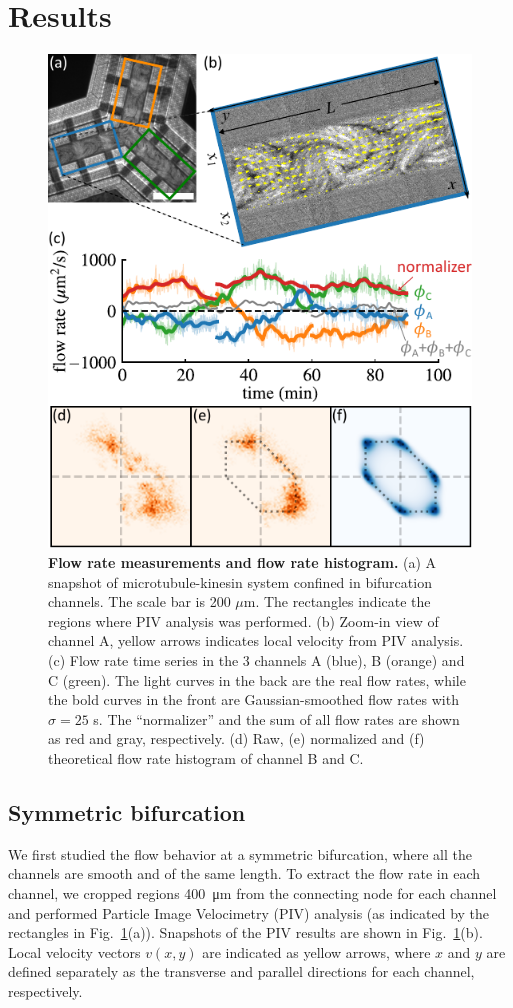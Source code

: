 \documentclass[%
10pt,
superscriptaddress,
twocolumn,
 amsmath,amssymb,
 aps,prx,
]{revtex4-2}
\begin{document}
\section{Results}

\begin{figure}[htb]
    \includegraphics[width=.45\textwidth]{3-bifurcation-symmetric}
    \caption{
    \textbf{Flow rate measurements and flow rate histogram.}
    (a) A snapshot of microtubule-kinesin system confined in bifurcation channels.
    The scale bar is 200 $\mu$m. The rectangles indicate the regions where PIV analysis was performed.
    (b) Zoom-in view of channel A, yellow arrows indicates local velocity from PIV analysis. 
    (c) Flow rate time series in the 3 channels A (blue), B (orange) and C (green). 
    The light curves in the back are the real flow rates, while the bold curves in the front are Gaussian-smoothed flow rates with $\sigma=25$ s. The ``normalizer'' and the sum of all flow rates are shown as red and gray, respectively. 
    (d) Raw, (e) normalized and (f) theoretical flow rate histogram of channel B and C. 
    }
    \label{fig:bifurcation-symmetric}
\end{figure}

\subsection{Symmetric bifurcation}

We first studied the flow behavior at a symmetric bifurcation, where all the channels are smooth and of the same length.
To extract the flow rate in each channel, we cropped regions \SI{400}{\micro\meter} from the connecting node for each channel and performed Particle Image Velocimetry (PIV) analysis (as indicated by the rectangles in Fig.~\ref{fig:bifurcation-symmetric}(a)).
Snapshots of the PIV results are shown in Fig.~\ref{fig:bifurcation-symmetric}(b).
Local velocity vectors $v(x,y)$ are indicated as yellow arrows, where $x$ and $y$ are defined separately as the transverse and parallel directions for each channel, respectively.
\end{document}
